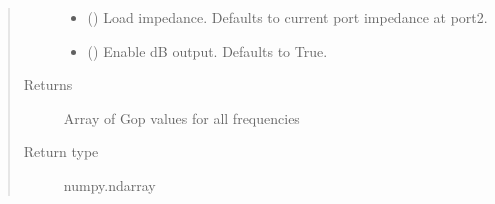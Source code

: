 \documentclass[letterpaper,10pt,english]{sphinxmanual}
\begin{document}
\begin{fulllineitems}
\begin{fulllineitems}
\begin{quote}
\begin{description}
\begin{itemize}
\item {} 
 (\sphinxstyleliteralemphasis{\sphinxupquote{, }}) \textendash{} Load impedance. Defaults to current port impedance at port2.

\item {} 
 (\sphinxstyleliteralemphasis{\sphinxupquote{, }}) \textendash{} Enable dB output. Defaults to True.

\end{itemize}

\item[{Returns}] \leavevmode
Array of Gop values for all frequencies

\item[{Return type}] \leavevmode
numpy.ndarray

\end{description}\end{quote}

\end{fulllineitems}



\end{fulllineitems}
\end{document}
